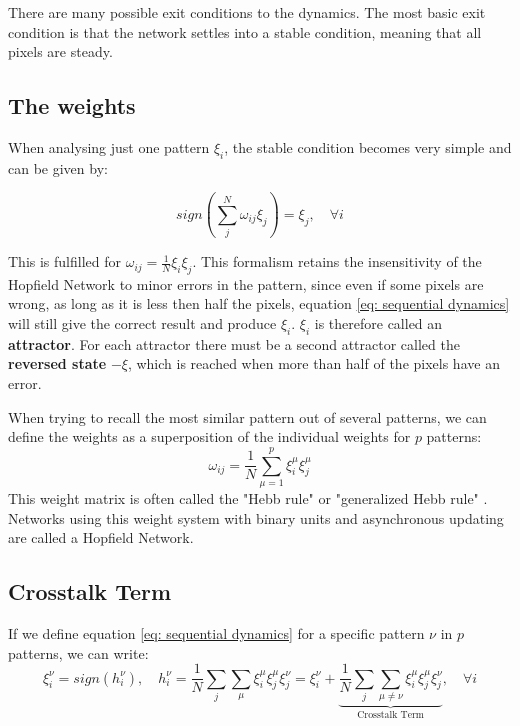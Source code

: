 There are many possible exit conditions to the dynamics. The most basic exit condition is  that the network settles into a stable condition, meaning that all pixels are steady. 

\subsection{The weights}

When analysing just one pattern $\xi_i$, the stable condition becomes very simple and can be given by:

\begin{equation}
sign\left( \sum_j^N \omega_{ij} \xi_j \right) = \xi_j, \quad	\forall i
\end{equation}

This is fulfilled for $\omega_{ij}=\frac{1}{N} \xi_i \xi_j$. This formalism retains the insensitivity of the Hopfield Network to minor errors in the pattern, since even if some pixels are wrong, as long as it is less then half the pixels, equation \ref{eq: sequential dynamics} will still give the correct result and produce $\xi_i$. $\xi_i$ is therefore called an \textbf{attractor}. For each attractor there must be a second attractor called the \textbf{reversed state} $-\xi$, which is reached when more than half of the pixels have an error. 

When trying to recall the most similar pattern out of several patterns, we can define the weights as a superposition of the individual weights for $p$ patterns:
\begin{equation}
\omega_{ij}=\frac{1}{N} \sum_{\mu=1}^p \xi_i^\mu \xi_j^\mu
\label{eq: weights}
\end{equation}
This weight matrix is often called the "Hebb rule" or "generalized Hebb rule" \citep{Polk:2002fk}. Networks using this weight system with binary units and asynchronous updating are called a Hopfield Network. 

\subsection{Crosstalk Term}

If we define equation \ref{eq: sequential dynamics} for a specific pattern $\nu$ in $p$ patterns, we can write:
\begin{equation}
\xi_i^\nu = sign(h_i^\nu), \quad h_i^\nu = \frac{1}{N} \sum_j \sum_\mu \xi_i^\mu \xi_j^\mu \xi_j^\nu = \xi_i^\nu + \underset{\mbox{Crosstalk Term}}{\underbrace{\frac{1}{N} \sum_j \sum_{\mu \neq \nu} \xi_i^\mu \xi_j^\mu \xi_j^\nu}}, \quad \forall i
\end{equation}

